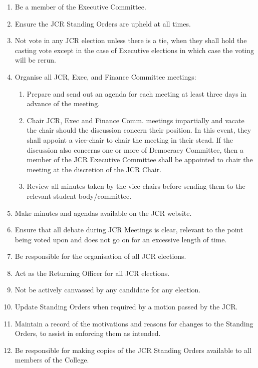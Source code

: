 \begin{enumerate}
    \item Be a member of the Executive Committee.
    \item Ensure the JCR Standing Orders are upheld at all times.
    \item Not vote in any JCR election unless there is a tie, when they shall hold the casting vote except in the case of Executive elections in which case the voting will be rerun.
    \item Organise all JCR, Exec, and Finance Committee meetings:
        \begin{enumerate}
            \item Prepare and send out an agenda for each meeting at least three days in advance of the meeting.
            \item Chair JCR, Exec and Finance Comm. meetings impartially and vacate the chair should the discussion concern their position. In this event, they shall appoint a vice-chair to chair the meeting in their stead. If the discussion also concerns one or more of Democracy Committee, then a member of the JCR Executive Committee shall be appointed to chair the meeting at the discretion of the JCR Chair.
            \item Review all minutes taken by the vice-chairs before sending them to the relevant student body/committee.
        \end{enumerate}
    \item Make minutes and agendas available on the JCR website. 
    \item Ensure that all debate during JCR Meetings is clear, relevant to the point being voted upon and does not go on for an excessive length of time. 
    \item Be responsible for the organisation of all JCR elections.
    \item Act as the Returning Officer for all JCR elections.
    \item Not be actively canvassed by any candidate for any election.
    \item Update Standing Orders when required by a motion passed by the JCR.
    \item Maintain a record of the motivations and reasons for changes to the Standing Orders, to assist in enforcing them as intended.
    \item Be responsible for making copies of the JCR Standing Orders available to all members of the College. 

\end{enumerate}

